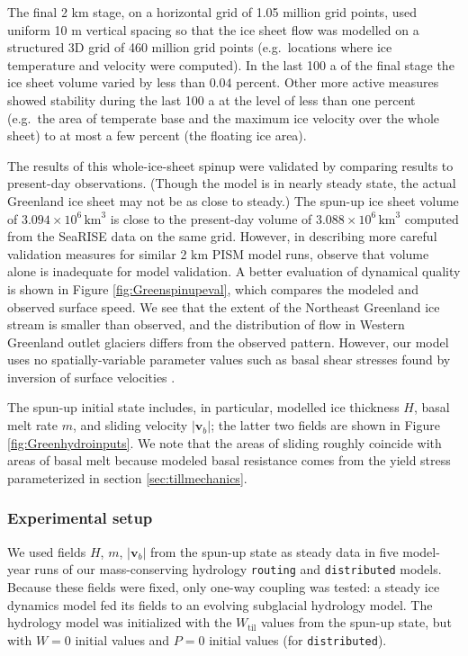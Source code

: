 \documentclass[gmd]{copernicus}   %
\newcommand{\text}{\textrm}
\newcommand\bv{\mathbf{v}}
\newcommand{\Wtil}{W_{\text{til}}}
\begin{document}
The final 2 km stage, on a horizontal grid of 1.05 million grid points, used uniform 10 m vertical spacing so that the ice sheet flow was modelled on a structured 3D grid of 460 million grid points (e.g.~locations where ice temperature and velocity were computed).  In the last 100 a of the final stage the ice sheet volume varied by less than $0.04$ percent.  Other more active measures showed stability during the last 100 a at the level of less than one percent (e.g.~the area of temperate base and the maximum ice velocity over the whole sheet) to at most a few percent (the floating ice area).
 
The results of this whole-ice-sheet spinup were validated by comparing results to present-day observations.  (Though the model is in nearly steady state, the actual Greenland ice sheet may not be as close to steady.)  The spun-up ice sheet volume of $3.094\times 10^{6}\,\textrm{km}^3$ is close to the present-day volume of $3.088\times 10^{6}\,\textrm{km}^3$ computed from the SeaRISE data on the same grid.  However, in describing more careful validation measures for similar 2 km PISM model runs, \cite{AschwandenAdalgeirsdottirKhroulev} observe that volume alone is inadequate for model validation.  A better evaluation of dynamical quality is shown in Figure \ref{fig:Greenspinupeval}, which compares the modeled and observed surface speed.  We see that the extent of the Northeast Greenland ice stream is smaller than observed, and the distribution of flow in Western Greenland outlet glaciers differs from the observed pattern.  However, our model uses no spatially-variable parameter values such as basal shear stresses found by inversion of surface velocities \citep{AschwandenAdalgeirsdottirKhroulev}.

The spun-up initial state includes, in particular, modelled ice thickness $H$, basal melt rate $m$, and sliding velocity $|\bv_b|$; the latter two fields are shown in Figure \ref{fig:Greenhydroinputs}.  We note that the areas of sliding roughly coincide with areas of basal melt because modeled basal resistance comes from the yield stress parameterized in section \ref{sec:tillmechanics}.

\subsubsection{Experimental setup}  We used fields $H$, $m$, $|\bv_b|$ from the spun-up state as steady data in five model-year runs of our mass-conserving hydrology \texttt{routing} and \texttt{distributed} models.  Because these fields were fixed, only one-way coupling was tested: a steady ice dynamics model fed its fields to an evolving subglacial hydrology model.  The hydrology model was initialized with the $\Wtil$ values from the spun-up state, but with $W=0$ initial values and $P=0$ initial values (for \texttt{distributed}).
\end{document}

